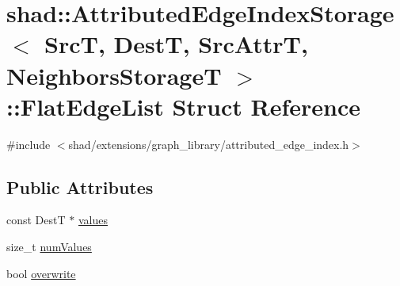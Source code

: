 \hypertarget{structshad_1_1AttributedEdgeIndexStorage_1_1FlatEdgeList}{\section{shad\-:\-:Attributed\-Edge\-Index\-Storage$<$ Src\-T, Dest\-T, Src\-Attr\-T, Neighbors\-Storage\-T $>$\-:\-:Flat\-Edge\-List Struct Reference}
\label{structshad_1_1AttributedEdgeIndexStorage_1_1FlatEdgeList}
}


{\ttfamily \#include $<$shad/extensions/graph\-\_\-library/attributed\-\_\-edge\-\_\-index.\-h$>$}

\subsection*{Public Attributes}
\begin{DoxyCompactItemize}
\item 
const Dest\-T $\ast$ \hyperlink{structshad_1_1AttributedEdgeIndexStorage_1_1FlatEdgeList_a09ef803794137cffa8938f6031c66bae}{values}
\item 
size\-\_\-t \hyperlink{structshad_1_1AttributedEdgeIndexStorage_1_1FlatEdgeList_a8ca2b13482b07be3cb2f6e831a05ae37}{num\-Values}
\item 
bool \hyperlink{structshad_1_1AttributedEdgeIndexStorage_1_1FlatEdgeList_a75a95f5d0e9d30a0ddbb2f71a1ec795a}{overwrite}
\end{DoxyCompactItemize}


